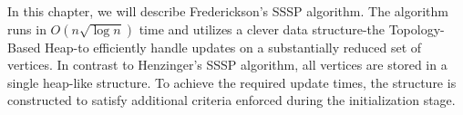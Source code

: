 In this chapter, we will describe Frederickson's SSSP algorithm\cite{frederickson}. The algorithm runs in $O(n \sqrt{\log n})$ time and utilizes a clever data structure-the Topology-Based Heap-to efficiently handle updates on a substantially reduced set of vertices. In contrast to Henzinger's SSSP algorithm, all vertices are stored in a single heap-like structure. To achieve the required update times, the structure is constructed to satisfy additional criteria enforced during the initialization stage.



